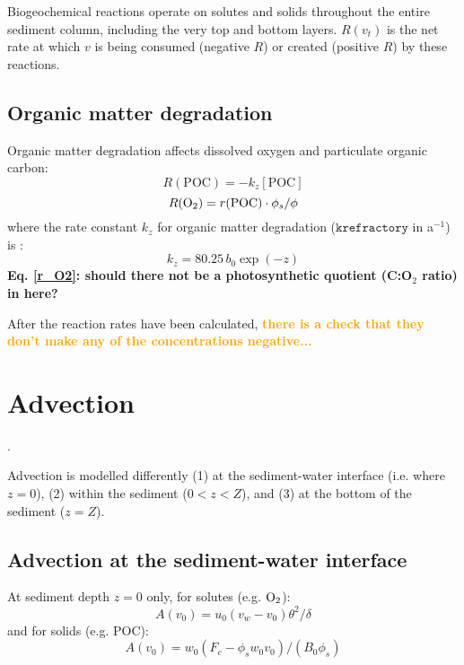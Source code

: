 \documentclass[a4paper]{article}
\newcommand{\code}[1]{\texttt{#1}}
\newcommand{\wtf}[1]{\textcolor{Cerulean}{\textbf{#1}}}
\newcommand{\codenote}[1]{\textcolor{Orange}{\textbf{#1}}}
\begin{document}
Biogeochemical reactions operate on solutes and solids throughout the entire sediment column, including the very top and bottom layers. $R(v_t)$ is the net rate at which $v$ is being consumed (negative $R$) or created (positive $R$) by these reactions.

\subsection{Organic matter degradation}

Organic matter degradation affects dissolved oxygen and particulate organic carbon:
\begin{equation}
R(\mathrm{POC}) = -k_z [\mathrm{POC}]
\end{equation}
\begin{equation}\label{r_O2}
R(\ce{O2}) = r(\mathrm{POC}) \cdot \phi_s / \phi
\end{equation}
where the rate constant $k_z$ for organic matter degradation ($\code{krefractory}$ in a$^{-1}$) is \citep{archer_model_2002}:
\begin{equation}\label{k_poc_degradation}
k_z = 80.25 \, b_0 \exp(-z)
\end{equation}
\wtf{Eq. \eqref{r_O2}: should there not be a photosynthetic quotient (C:O$_2$ ratio) in here?}

After the reaction rates have been calculated, \codenote{there is a check that they don't make any of the concentrations negative...}


\section{Advection}\label{sx:advection}.

Advection is modelled differently (1) at the sediment-water interface (i.e. where $z = 0$), (2) within the sediment ($0 < z < Z$), and (3) at the bottom of the sediment ($z = Z$).

\subsection{Advection at the sediment-water interface}\label{sx:adv_swi}

At sediment depth $z = 0$ only, for solutes (e.g. $\ce{O2}$):
\begin{equation}
A(v_0) = u_0 (v_w - v_0) \theta^2 / \delta
\end{equation}
and for solids (e.g. POC):
\begin{equation}
A(v_0) = w_0 (F_c - \phi_s w_0 v_0) / (B_0 \phi_s)
\end{equation}
\end{document}
